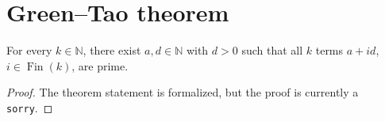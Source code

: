 \section{Green--Tao theorem}

\begin{theorem}
\label{thm:green-tao}
\notready
For every $k\in\mathbb N$, there exist $a,d\in\mathbb N$ with $d>0$ such that all $k$ terms $a+id$, $i\in\operatorname{Fin}(k)$, are prime.
\end{theorem}

\begin{proof}
The theorem statement is formalized, but the proof is currently a \texttt{sorry}.
\end{proof}
